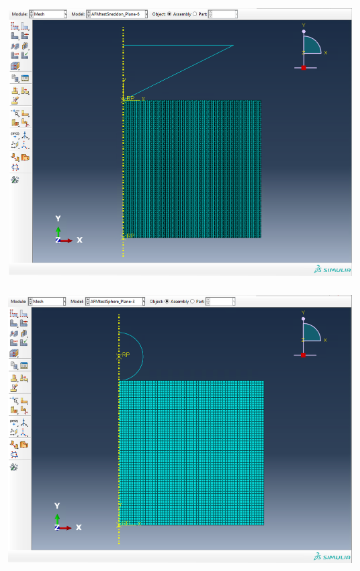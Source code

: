 \begin{figure}[H]
    \begin{subfigure}{0.3\textwidth}
        \centering
        \caption{\label{fig: Cone-Plane-ABAQUS-setup}}
        \includegraphics[width=1\linewidth]{Figures/Cone-Plane-ABAQUS-setup.png}
    \end{subfigure}  
    \hfill  
    \begin{subfigure}{0.3\textwidth}
        \centering
        \caption{\label{fig: Sphere-Plane-ABAQUS-setup}}
        \includegraphics[width=1\linewidth]{Figures/Sphere-Plane-ABAQUS-setup.png}
    \end{subfigure}  
    \hfill
    \begin{subfigure}{0.3\textwidth}

\end{subfigure}
\end{figure}
